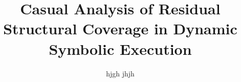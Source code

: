\documentclass{acm_proc_article-sp}
\begin{document}
\title{Casual Analysis of Residual Structural Coverage in Dynamic Symbolic Execution}

%

\author{hjgh jhjh}
%
\maketitle







\end{document}
